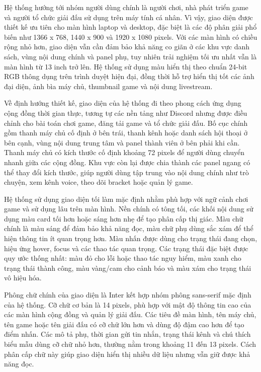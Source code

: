 \documentclass[../DoAn.tex]{subfiles}
\begin{document}
Hệ thống hướng tới nhóm người dùng chính là người chơi, nhà phát triển game và người tổ chức giải đấu sử dụng trên máy tính cá nhân. Vì vậy, giao diện được thiết kế ưu tiên cho màn hình laptop và desktop, đặc biệt là các độ phân giải phổ biến như 1366 x 768, 1440 x 900 và 1920 x 1080 pixels. Với các màn hình có chiều rộng nhỏ hơn, giao diện vẫn cần đảm bảo khả năng co giãn ở các khu vực danh sách, vùng nội dung chính và panel phụ, tuy nhiên trải nghiệm tối ưu nhất vẫn là màn hình từ 13 inch trở lên. Hệ thống sử dụng màu hiển thị theo chuẩn 24-bit RGB thông dụng trên trình duyệt hiện đại, đồng thời hỗ trợ hiển thị tốt các ảnh đại diện, ảnh bìa máy chủ, thumbnail game và nội dung livestream.

Về định hướng thiết kế, giao diện của hệ thống đi theo phong cách ứng dụng cộng đồng thời gian thực, tương tự các nền tảng như Discord nhưng được điều chỉnh cho bài toán chơi game, đăng tải game và tổ chức giải đấu. Bố cục chính gồm thanh máy chủ cố định ở bên trái, thanh kênh hoặc danh sách hội thoại ở bên cạnh, vùng nội dung trung tâm và panel thành viên ở bên phải khi cần. Thanh máy chủ có kích thước cố định khoảng 72 pixels để người dùng chuyển nhanh giữa các cộng đồng. Khu vực còn lại được chia thành các panel ngang có thể thay đổi kích thước, giúp người dùng tập trung vào nội dung chính như trò chuyện, xem kênh voice, theo dõi bracket hoặc quản lý game.

Hệ thống sử dụng giao diện tối làm mặc định nhằm phù hợp với ngữ cảnh chơi game và sử dụng lâu trên màn hình. Nền chính có tông tối, các khối nội dung sử dụng màu card tối hơn hoặc sáng hơn nhẹ để tạo phân cấp thị giác. Màu chữ chính là màu sáng để đảm bảo khả năng đọc, màu chữ phụ dùng sắc xám để thể hiện thông tin ít quan trọng hơn. Màu nhấn được dùng cho trạng thái đang chọn, hiệu ứng hover, focus và các thao tác quan trọng. Các trạng thái đặc biệt được quy ước thống nhất: màu đỏ cho lỗi hoặc thao tác nguy hiểm, màu xanh cho trạng thái thành công, màu vàng/cam cho cảnh báo và màu xám cho trạng thái vô hiệu hóa.

Phông chữ chính của giao diện là Inter kết hợp nhóm phông sans-serif mặc định của hệ thống. Cỡ chữ cơ bản là 14 pixels, phù hợp với mật độ thông tin cao của các màn hình cộng đồng và quản lý giải đấu. Các tiêu đề màn hình, tên máy chủ, tên game hoặc tên giải đấu có cỡ chữ lớn hơn và dùng độ đậm cao hơn để tạo điểm nhấn. Các mô tả phụ, thời gian gửi tin nhắn, trạng thái kênh và chú thích biểu mẫu dùng cỡ chữ nhỏ hơn, thường nằm trong khoảng 11 đến 13 pixels. Cách phân cấp chữ này giúp giao diện hiển thị nhiều dữ liệu nhưng vẫn giữ được khả năng đọc.
\end{document}

